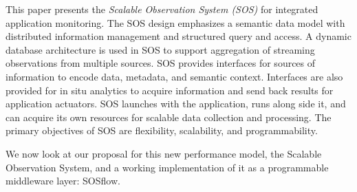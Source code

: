 This paper presents the \textit{Scalable Observation System (SOS)} for
integrated application monitoring.
%
The SOS design emphasizes a semantic data model with distributed
information management and structured query and access.
%
A dynamic database architecture is used in SOS to support aggregation
of streaming observations from multiple sources.
%
SOS provides interfaces for sources of information to encode data,
metadata, and semantic context.
%
Interfaces are also provided for in situ analytics to acquire
information and send back results for application actuators.
%
SOS launches with the application, runs along side it, and can acquire
its own resources for scalable data collection and processing.
%
The primary objectives of SOS are flexibility, scalability, and
programmability.





We now look at our proposal for this new performance model, the
Scalable Observation System, and a working implementation of it
as a programmable middleware layer: SOSflow.


